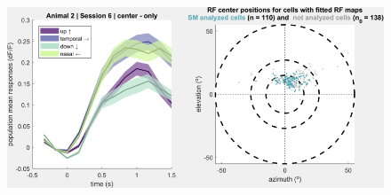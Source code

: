 \begin{figure}[H] \centering \includegraphics[width=13cm,height=13cm,keepaspectratio]{Figures/7.Results/population/sel/6_popPlots_Animal2_Session6.png} 
\end{figure}

%
%

